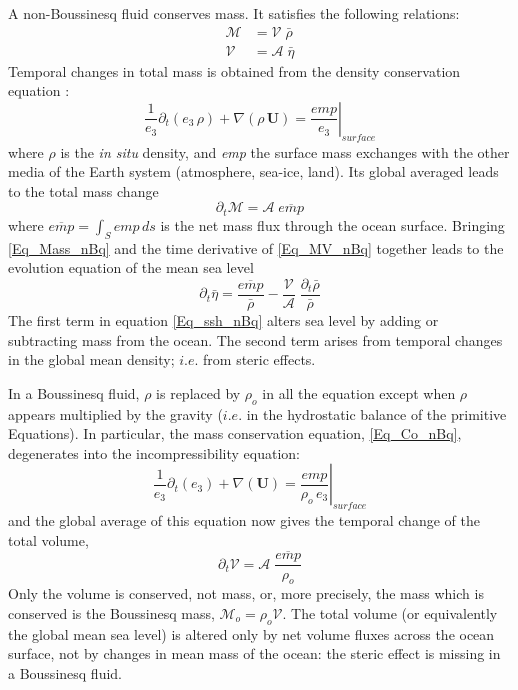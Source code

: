 A non-Boussinesq fluid conserves mass. It satisfies the following relations:
\begin{equation} \label{Eq_MV_nBq} 
\begin{split} 
\mathcal{M} &=  \mathcal{V}  \;\bar{\rho}      	\\
\mathcal{V} &=  \mathcal{A}  \;\bar{\eta}	
\end{split}
\end{equation}
Temporal changes in total mass is obtained from the density conservation equation :
\begin{equation}  \label{Eq_Co_nBq}
\frac{1}{e_3} \partial_t ( e_3\,\rho) + \nabla( \rho \, \textbf{U} ) = \left. \frac{\textit{emp}}{e_3}\right|_\textit{surface}
\end{equation}
where $\rho$ is the \textit{in situ} density, and \textit{emp} the surface mass 
exchanges with the other media of the Earth system (atmosphere, sea-ice, land). 
Its global averaged leads to the total mass change 
\begin{equation}  \label{Eq_Mass_nBq}
\partial_t \mathcal{M} = \mathcal{A} \;\overline{\textit{emp}}
\end{equation}
where $\overline{\textit{emp}}=\int_S \textit{emp}\,ds$ is the net mass flux 
through the ocean surface.
Bringing \eqref{Eq_Mass_nBq} and the time derivative of \eqref{Eq_MV_nBq} 
together leads to the evolution equation of the mean sea level
\begin{equation} \label{Eq_ssh_nBq}
  \partial_t \bar{\eta} =  \frac{\overline{\textit{emp}}}{ \bar{\rho}} 
  					- \frac{\mathcal{V}}{\mathcal{A}}  \;\frac{\partial_t \bar{\rho} }{\bar{\rho}}
\end{equation}
The first term in equation \eqref{Eq_ssh_nBq} alters sea level by adding or 
subtracting mass from the ocean. 
The second term arises from temporal changes in the global mean 
density; $i.e.$ from steric effects. 

In a Boussinesq fluid, $\rho$ is replaced by $\rho_o$ in all the equation except when $\rho$ 
appears multiplied by the gravity ($i.e.$ in the hydrostatic balance of the primitive Equations). 
In particular, the mass conservation equation, \eqref{Eq_Co_nBq}, degenerates into 
the incompressibility equation:
\begin{equation}  \label{Eq_Co_Bq}
\frac{1}{e_3} \partial_t ( e_3 ) + \nabla( \textbf{U} ) =  \left. \frac{\textit{emp}}{\rho_o \,e_3}\right|_ \textit{surface}
\end{equation}
and the global average of this equation now gives the temporal change of the total volume,
\begin{equation}  \label{Eq_V_Bq}
  \partial_t \mathcal{V} =   \mathcal{A} \;\frac{\overline{\textit{emp}}}{\rho_o} 
\end{equation}
Only the volume is conserved, not mass, or, more precisely, the mass which is conserved is the 
Boussinesq mass, $\mathcal{M}_o = \rho_o \mathcal{V}$. The total volume (or equivalently  
the global mean sea level) is altered only by net volume fluxes across the ocean surface,  
not by changes in mean mass of the ocean: the steric effect is missing in a Boussinesq fluid.
 
